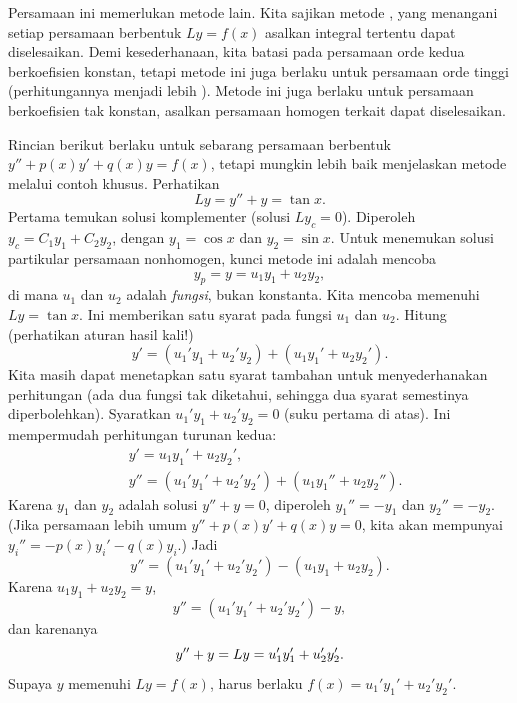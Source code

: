 Persamaan ini memerlukan metode lain. Kita sajikan metode \emph{}, yang menangani setiap persamaan berbentuk $Ly = f(x)$ asalkan integral tertentu dapat diselesaikan. Demi kesederhanaan, kita batasi pada persamaan orde kedua berkoefisien konstan, tetapi metode ini juga berlaku untuk persamaan orde tinggi (perhitungannya menjadi lebih ). %
Metode ini juga berlaku untuk persamaan berkoefisien tak konstan, asalkan persamaan homogen terkait dapat diselesaikan.

Rincian berikut berlaku untuk sebarang persamaan berbentuk $y''+p(x)y' +q(x)y = f(x)$, tetapi mungkin lebih baik menjelaskan metode melalui contoh khusus. Perhatikan
\begin{equation*}
Ly = y''+y = \tan x .
\end{equation*}
Pertama temukan solusi komplementer (solusi $Ly_c = 0$). Diperoleh $y_c = C_1 y_1 + C_2 y_2$, dengan $y_1 = \cos x$ dan $y_2 = \sin x$. Untuk menemukan solusi partikular persamaan nonhomogen, kunci metode ini adalah mencoba
\begin{equation*}
y_p = y = u_1 y_1 + u_2 y_2 ,
\end{equation*}
di mana $u_1$ dan $u_2$ adalah \emph{fungsi}, bukan konstanta. Kita mencoba memenuhi $Ly = \tan x$. Ini memberikan satu syarat pada fungsi $u_1$ dan $u_2$. Hitung (perhatikan aturan hasil kali!)
\begin{equation*}
y' = (u_1' y_1 + u_2' y_2) + (u_1 y_1' + u_2 y_2').
\end{equation*}
Kita masih dapat menetapkan satu syarat tambahan untuk menyederhanakan perhitungan (ada dua fungsi tak diketahui, sehingga dua syarat semestinya diperbolehkan). Syaratkan $u_1' y_1 + u_2' y_2 = 0$ (suku pertama di atas). Ini mempermudah perhitungan turunan kedua:
\begin{align*}
& y' = u_1 y_1' + u_2 y_2' , \\
& y'' = (u_1' y_1' + u_2' y_2') + (u_1 y_1'' + u_2 y_2'') .
\end{align*}
Karena $y_1$ dan $y_2$ adalah solusi $y''+y = 0$, diperoleh $y_1'' = - y_1$ dan $y_2'' = - y_2$. (Jika persamaan lebih umum $y''+p(x)y' +q(x)y = 0$, kita akan mempunyai $y_i'' = -p(x)y_i' -q(x)y_i$.) Jadi
\begin{equation*}
y'' = (u_1' y_1' + u_2' y_2') - (u_1 y_1 + u_2 y_2) .
\end{equation*}
Karena $u_1 y_1 + u_2 y_2 = y$,
\begin{equation*}
y'' = (u_1' y_1' + u_2' y_2') - y ,
\end{equation*}
dan karenanya
\begin{equation*}
y'' + y = Ly = u_1' y_1' + u_2' y_2' .
\avoidbreak
\end{equation*}
Supaya $y$ memenuhi $Ly = f(x)$, harus berlaku $f(x) = u_1' y_1' + u_2' y_2'$.

